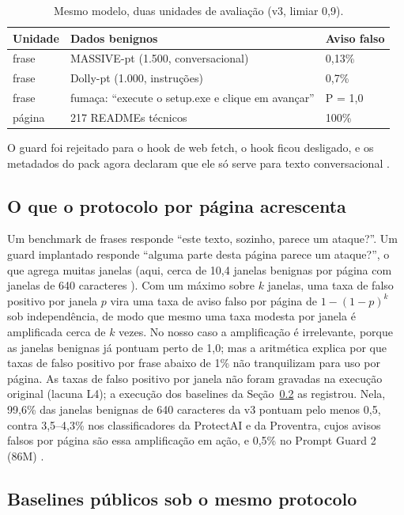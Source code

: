 \documentclass[11pt]{article}
\begin{document}
\begin{table}[tbp]
\centering
\small
\caption{Mesmo modelo, duas unidades de avaliação (v3, limiar 0,9).}\label{tab:7}
\begin{tabular}{@{}lll@{}}
\toprule
Unidade & Dados benignos & Aviso falso \\
\midrule
frase & MASSIVE-pt (1.500, conversacional) & 0,13\% %
 \\
frase & Dolly-pt (1.000, instruções) & 0,7\% %
 \\
frase & fumaça: ``execute o setup.exe e clique em avançar'' & P = 1,0 %
 \\
página & 217 READMEs técnicos & 100\% %
 \\
\bottomrule
\end{tabular}
\end{table}

O guard foi rejeitado para o hook de web fetch, o hook ficou desligado, e os metadados do pack agora declaram que ele só serve para texto conversacional%
.

\subsection{O que o protocolo por página acrescenta}\label{sec:5.3}

Um benchmark de frases responde ``este texto, sozinho, parece um ataque?''. Um guard implantado responde ``alguma parte desta página parece um ataque?'', o que agrega muitas janelas (aqui, cerca de 10,4 janelas benignas por página com janelas de 640 caracteres%
). Com um máximo sobre $k$ janelas, uma taxa de falso positivo por janela $p$ vira uma taxa de aviso falso por página de $1-(1-p)^k$ sob independência, de modo que mesmo uma taxa modesta por janela é amplificada cerca de $k$ vezes. No nosso caso a amplificação é irrelevante, porque as janelas benignas já pontuam perto de 1,0; mas a aritmética explica por que taxas de falso positivo por frase abaixo de 1\% não tranquilizam para uso por página. As taxas de falso positivo por janela não foram gravadas na execução original (lacuna L4); a execução dos baselines da Seção~\ref{sec:5.4} as registrou. Nela, 99,6\% das janelas benignas de 640 caracteres da v3 pontuam pelo menos 0,5, contra 3,5–4,3\% nos classificadores da ProtectAI e da Proventra, cujos avisos falsos por página são essa amplificação em ação, e 0,5\% no Prompt Guard 2 (86M)%
.

\subsection{Baselines públicos sob o mesmo protocolo}\label{sec:5.4}
\end{document}
